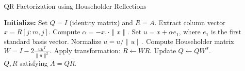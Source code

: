 
\begin{algorithm}
	\caption{QR Factorization using Householder Reflections}
	\label{alg:householder_qr}
	\begin{algorithmic}[1]
		\State \textbf{Initialize:} Set \( Q = I \) (identity matrix) and \( R = A \).
		\State Extract column vector \( x = R[j:m, j] \).
		\State Compute \( \alpha = -x_1 \cdot \|x\| \).
		\State Set \( u = x + \alpha e_1 \), where \( e_1 \) is the first standard basis vector.
		\State Normalize \( u = u / \|u\| \).
		\State Compute Householder matrix \( W = I - 2 \frac{uu^T}{\|u\|^2} \).
		\State Apply transformation: \( R \gets W R \).
		\State Update \( Q \gets Q W^T \).
		\EndFor\\
		\Return \( Q, R \) satisfying \( A = QR \).
	\end{algorithmic}
\end{algorithm}
